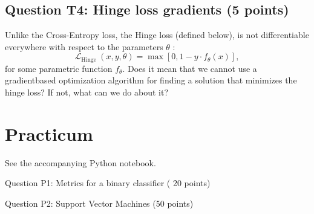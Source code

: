 \documentclass[10pt]{article}
\begin{document}
\subsection*{Question T4: Hinge loss gradients (5 points)}
Unlike the Cross-Entropy loss, the Hinge loss (defined below), is not differentiable everywhere with respect to the parameters $\theta$ :
$$
\mathcal{L}_{\text {Hinge }}(x, y, \theta)=\max \left[0,1-y \cdot f_{\theta}(x)\right],
$$
for some parametric function $f_{\theta}$. Does it mean that we cannot use a gradientbased optimization algorithm for finding a solution that minimizes the hinge loss? If not, what can we do about it?

\section*{Practicum}
See the accompanying Python notebook.

Question P1: Metrics for a binary classifier ( 20 points)

Question P2: Support Vector Machines (50 points)
\end{document}
